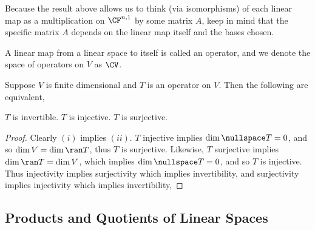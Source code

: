 \documentclass{article}
\begin{document}
  Because the result above allows us to think (via isomorphisms) of each linear map as a multiplication on $\CF^{n, 1}$ by some matrix $A$, keep in mind that the specific matrix $A$ depends
  on the linear map itself and the bases chosen.
  \begin{defn}
    A linear map from a linear space to itself is called an operator, and we denote the space of operators on $V$ as $\CV$.
  \end{defn}
  \begin{prop}
    Suppose $V$ is finite dimensional and $T$ is an operator on $V$. Then the following are equivalent,
    \begin{enumerate}[label=\roman*)]
      \ii $T$ is invertible.
      \ii $T$ is injective.
      \ii $T$ is surjective.
    \end{enumerate}
  \end{prop}
  \begin{proof}
    Clearly $(i)$ implies $(ii)$. $T$ injective implies $\dim\nullspace T = 0$, and so $\dim V = \dim\ran T$, thus $T$ is surjective. Likewise, $T$ surjective implies $\dim\ran T = \dim V$,
    which implies $\dim\nullspace T = 0$, and so $T$ is injective. Thus injectivity implies surjectivity which implies invertibility, and surjectivity implies injectivity which implies invertibility,
  \end{proof}
\subsection{Products and Quotients of Linear Spaces}
\end{document}
